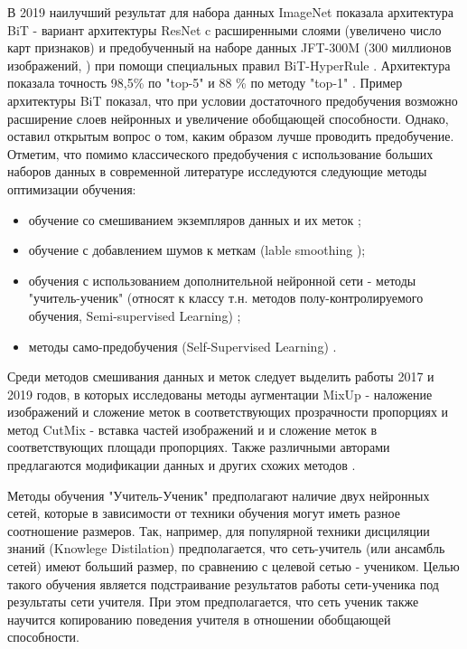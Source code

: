\documentclass[12pt]{article}
\begin{document}
\begin{sloppypar}
В 2019 наилучший результат для набора данных ImageNet показала архитектура BiT - вариант архитектуры ResNet c расширенными слоями (увеличено число карт признаков) и предобученный на наборе данных  JFT-300M (300 миллионов изображений, \cite{sun2017revisiting}) при помощи специальных правил BiT-HyperRule \cite{kolesnikov2020big}. Архитектура показала точность 98,5\% по "top-5" и 88 \% по методу "top-1" \cite{paperswithcodeImagenet}. Пример архитектуры BiT показал, что при условии достаточного предобучения возможно расширение слоев нейронных и увеличение обобщающей способности. Однако, оставил открытым вопрос о том, каким образом лучше проводить предобучение.
Отметим, что помимо классического предобучения с использование больших наборов данных в современной литературе исследуются следующие методы оптимизации обучения:
\begin{itemize} \itemsep 0.1em 
    \item обучение со смешиванием экземпляров данных и их меток \cite{shorten2019survey};
    \item обучение с добавлением шумов к меткам (lable smoothing \cite{muller2019does});
    \item обучения с использованием дополнительной нейронной сети - методы "учитель-ученик" 
    (относят к классу т.н. методов полу-контролируемого обучения, Semi-supervised Learning) \cite{yang2021survey}; 
    \item методы само-предобучения (Self-Supervised Learning) \cite{liu2021self}.  
\end{itemize}

Среди методов смешивания данных и меток следует выделить работы 2017 и 2019 годов, в которых исследованы методы аугментации MixUp - наложение изображений и сложение меток в соответствующих прозрачности пропорциях \cite{zhang2017mixup} и метод CutMix - вставка частей изображений и  и сложение меток в соответствующих площади пропорциях. Также различными авторами предлагаются модификации данных и других схожих методов \cite{shorten2019survey}.

Методы обучения "Учитель-Ученик" предполагают наличие двух нейронных сетей, которые в зависимости от техники обучения могут иметь разное соотношение размеров. Так, например, для популярной техники дисциляции знаний (Knowlege Distilation) предполагается, что сеть-учитель (или ансамбль сетей) имеют больший размер, по сравнению с целевой сетью - учеником.  Целью такого обучения является подстраивание результатов работы сети-ученика под результаты сети учителя. При этом предполагается, что сеть ученик также научится копированию поведения учителя в отношении обобщающей способности.
\cite{gou2021knowledge}


\end{sloppypar}
\end{document}
